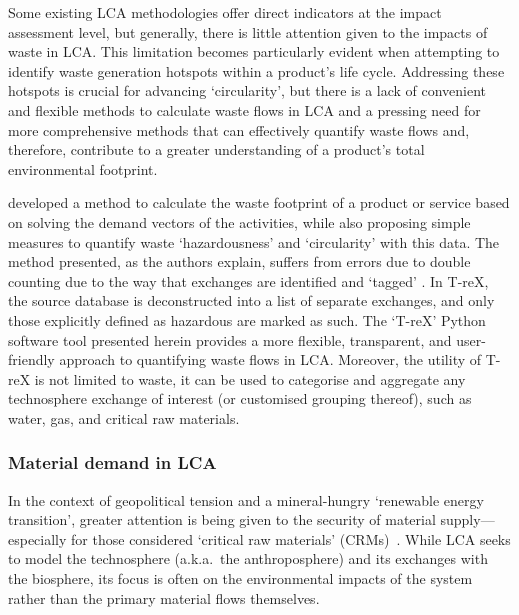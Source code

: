 Some existing LCA methodologies offer direct indicators at the impact assessment level, but generally, there is little attention given to the impacts of waste in LCA\citep{lauran2020abioticdepletion}. This limitation becomes particularly evident when attempting to identify waste generation hotspots within a product's life cycle. Addressing these hotspots is crucial for advancing `circularity', but there is a lack of convenient and flexible methods to calculate waste flows in LCA and a pressing need for more comprehensive methods that can effectively quantify waste flows and, therefore, contribute to a greater understanding of a product's total environmental footprint.

\cite{laurenti2023wastefootprint} developed a method to calculate the waste footprint of a product or service based on solving the demand vectors of the activities, while also proposing simple measures to quantify waste `hazardousness' and `circularity' with this data. The method presented, as the authors explain, suffers from errors due to double counting due to the way that exchanges are identified and `tagged' . In T-reX, the source database is deconstructed into a list of separate exchanges, and only those explicitly defined as hazardous are marked as such. The `T-reX' Python software tool presented herein provides a more flexible, transparent, and user-friendly approach to quantifying waste flows in LCA\@. Moreover, the utility of T-reX is not limited to waste, it can be used to categorise and aggregate any technosphere exchange of interest (or customised grouping thereof), such as water, gas, and critical raw materials.

\subsubsection{Material demand in LCA}\label{sec:intro-material}

In the context of geopolitical tension and a mineral-hungry `renewable energy transition', greater attention is being given to the security of material supply---especially for those considered `critical raw materials' (CRMs)~\citep{eu2023crmstudy,hool2023crm,mancini2013supplysecurity,jrc2023supplychain,hartley2024cepolitics,salviulo2021supplychain,iea2023crm,iea2023energytechperspectives}. While LCA seeks to model the technosphere (a.k.a.\ the anthroposphere) and its exchanges with the biosphere, its focus is often on the environmental impacts of the system rather than the primary material flows themselves.

